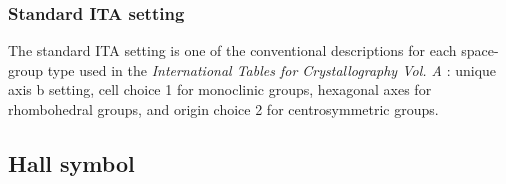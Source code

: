 \subsubsection{Standard ITA setting}

The standard ITA setting is one of the conventional descriptions for each space-group type used in the \textit{International Tables for Crystallography Vol. A} \cite{ITA2016}: unique axis b setting, cell choice 1 for monoclinic groups, hexagonal axes for rhombohedral groups, and origin choice 2 for centrosymmetric groups.


\subsection{Hall symbol}

